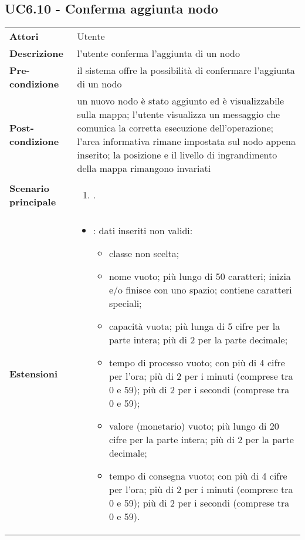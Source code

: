 \subsection{UC6.10 - Conferma aggiunta nodo} 
\label{sssec:UC6.10} 
\def\arraystretch{1.5}
\begin{tabularx}{\textwidth}{l|p{}}
	\rowcolor{I} \multicolumn{2}{c}{\color{white}\textbf{UC6.10 - Conferma aggiunta nodo}} \\
	\toprule
	\endhead
	\textbf{Attori} & Utente\\
	\textbf{Descrizione} & l'utente conferma l'aggiunta di un nodo\\
	\textbf{Pre-condizione} & il sistema offre la possibilità di confermare l'aggiunta di un nodo\\
	\textbf{Post-condizione} & un nuovo nodo è stato aggiunto ed è visualizzabile sulla mappa; l'utente visualizza un messaggio che comunica la corretta esecuzione dell'operazione; l'area informativa rimane impostata sul nodo appena inserito; la posizione e il livello di ingrandimento della mappa rimangono invariati\\
	\textbf{Scenario principale} & \vspace{-1.2em}\begin{enumerate}[leftmargin=*,noitemsep,nosep]
		\item \nameref{sssec:UC6.10}.
	\end{enumerate}\\
	\textbf{Estensioni} & \vspace{-1.2em}\begin{itemize}[leftmargin=*,noitemsep,nosep]
		\item \nameref{sssec:UC6.11}: dati inseriti non validi:
		\begin{itemize}
			\item classe non scelta;
			\item nome vuoto; più lungo di 50 caratteri; inizia e/o finisce con uno spazio; contiene caratteri speciali;
			\item capacità vuota; più lunga di 5
			cifre per la parte intera; più di 2 per la parte decimale;
			\item tempo di processo vuoto;
			con più di 4 cifre per l'ora; più di 2 per i minuti (comprese tra 0 e 59); più di 2 per i secondi (comprese tra 0 e 59);
			\item valore (monetario) vuoto; più lungo di 20 cifre per la parte intera; più di 2 per la parte decimale;
			\item tempo di consegna vuoto; con più di 4 cifre per l'ora; più di 2 per i minuti (comprese tra 0 e 59); più di 2 per i secondi (comprese tra 0 e 59).
		\end{itemize}
	\end{itemize}\\
	\bottomrule
\end{tabularx}
